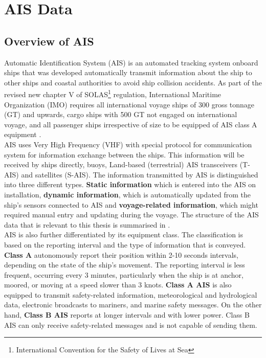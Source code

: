 \pagebreak

\section{AIS Data}\label{sec:ais_theo}

\subsection{Overview of AIS}

Automatic Identification System (AIS) is an automated tracking system onboard ships that was developed automatically transmit information about the ship to other ships and coastal authorities to avoid ship collision accidents. As part of the revised new chapter V of SOLAS\footnote{International Convention for the Safety of Lives at Sea} regulation, International Maritime Organization (IMO) requires all international voyage ships of 300 gross tonnage (GT) and upwards, cargo ships with 500 GT not engaged on international voyage, and all passenger ships irrespective of size to be equipped of AIS class A equipment .\\

AIS uses Very High Frequency (VHF) with special protocol for communication system for information exchange between the ships. This information will be received by ships directly, buoys, Land-based (terrestrial) AIS transceivers (T-AIS) and satellites (S-AIS). The information transmitted by AIS is distinguished into three different types. \textbf{Static information} which is entered into the AIS on installation, \textbf{dynamic information}, which is automatically updated from the ship's sensors connected to AIS and \textbf{voyage-related information}, which might required manual entry and updating during the voyage. The structure of the AIS data that is relevant to this thesis is summarised in .\\

AIS is also further differentiated by its equipment class. The classification is based on the reporting interval and the type of information that is conveyed. \textbf{Class A} autonomously report their position within 2-10 seconds intervals, depending on the state of the ship's movement. The reporting interval is less frequent, occurring every 3 minutes, particularly when the ship is at anchor, moored, or moving at a speed slower than 3 knots. \textbf{Class A AIS} is also equipped to transmit safety-related information, meteorological and hydrological data, electronic broadcasts to mariners, and marine safety messages.  On the other hand, \textbf{Class B AIS} reports at longer intervals and with lower power. Class B AIS can only receive safety-related messages and is not capable of sending them. 

